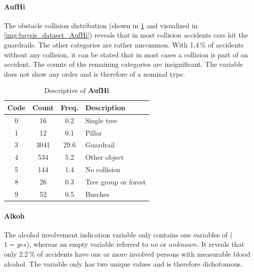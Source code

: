 \paragraph{AufHi}
\label{baysis_dataset_AufHi}
The obstacle collision distribution (shown in \cref{tbl:baysis_dataset_AufHi} and visualized in \cref{img:baysis_dataset_AufHi}) reveals that in most collision accidents cars hit the guardrails. The other categories are rather uncommon. With 1,4\,\% of accidents without any collision, it can be stated that in most cases a collision is part of an accident. The counts of the remaining categories are insignificant. The variable does not show any order and is therefore of a nominal type.
\begin{table}[ht]
	\centering
	\small
	\begin{tabular}{c|c|c|l} 
		\toprule
		Code & Count & Freq. & Description \\ 
		\midrule 
		0 & 16 		& 0.2	& Single tree \\
		1 & 12 		& 0.1	& Pillar \\
		3 & 3041	& 29.6	& Guardrail \\
		4 & 534		& 5.2	& Other object \\
		5 & 144		& 1.4	& No collision \\
		8 & 26		& 0.3	& Tree group or forest \\
		9 & 52		& 0.5	& Busches \\
		\bottomrule
	\end{tabular}
	\caption{Descriptive of \textbf{AufHi}}
	\label{tbl:baysis_dataset_AufHi}
	\vspace{-8mm}
\end{table}
\paragraph{Alkoh}
\label{baysis_dataset_Alkoh}
The alcohol involvement indication variable only contains one variables of ($1 = yes$), whereas an empty variable referred to $no$ or $unknown$. It reveals that only 2.2\,\% of accidents have one or more involved persons with measurable blood alcohol. The variable only has two unique values and is therefore dichotomous.
